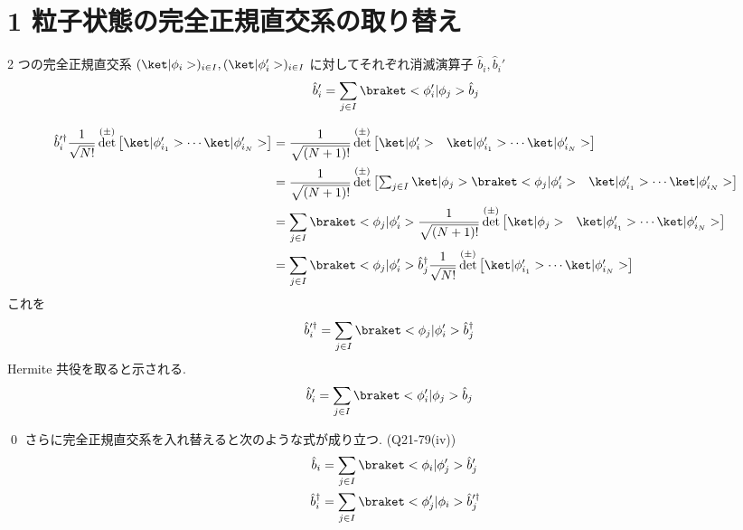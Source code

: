 \documentclass[uplatex,dvipdfmx,a4paper,11pt]{jlreq}
\makeatletter
\DeclareMathOperator{\Det}{det}
\numberwithin{equation}{section}
\theoremstyle{definition}
\renewenvironment{proof}[1][\proofname]{\par
  \normalfont
  \topsep6\p@\@plus6\p@ \trivlist
  \item[\hskip\labelsep{\bfseries #1}\@addpunct{\bfseries}]\ignorespaces\quad\par
}{
  \qed\endtrivlist\@endpefalse
}
\renewcommand\proofname{証明}
\makeatother
\begin{document}
\section{1 粒子状態の完全正規直交系の取り替え}
\begin{theorem}
  2 つの完全正規直交系 $(\ket|\phi_i>)_{i\in I}, (\ket|\phi_i'>)_{i\in I}$ に対してそれぞれ消滅演算子 $\hat{b}_i, \hat{b}_i'$
  \begin{align}
    \hat{b}_i' = \sum_{j\in I}\braket<\phi_i'|\phi_j>\hat{b}_j
  \end{align}
\end{theorem}
\begin{proof}
  \begin{align}
    \hat{b}_i^{\prime\dagger}\frac{1}{\sqrt{N!}}\Det^{(\pm)}\begin{bmatrix}\ket|\phi_{i_1}'>\cdots\ket|\phi_{i_N}'>\end{bmatrix}
     & = \frac{1}{\sqrt{(N+1)!}}\Det^{(\pm)}\begin{bmatrix}\ket|\phi_i'> & \ket|\phi_{i_1}'>\cdots\ket|\phi_{i_N}'>\end{bmatrix}                                    \\
     & = \frac{1}{\sqrt{(N+1)!}}\Det^{(\pm)}\begin{bmatrix}\sum_{j\in I}\ket|\phi_j>\braket<\phi_j|\phi_i'> & \ket|\phi_{i_1}'>\cdots\ket|\phi_{i_N}'>\end{bmatrix} \\
     & = \sum_{j\in I}\braket<\phi_j|\phi_i'>\frac{1}{\sqrt{(N+1)!}}\Det^{(\pm)}\begin{bmatrix}\ket|\phi_j> & \ket|\phi_{i_1}'>\cdots\ket|\phi_{i_N}'>\end{bmatrix} \\
     & = \sum_{j\in I}\braket<\phi_j|\phi_i'>\hat{b}_j^\dagger\frac{1}{\sqrt{N!}}\Det^{(\pm)}\begin{bmatrix}\ket|\phi_{i_1}'>\cdots\ket|\phi_{i_N}'>\end{bmatrix}
  \end{align}
  これを
  \begin{align}
    \hat{b}_i^{\prime\dagger} & = \sum_{j\in I}\braket<\phi_j|\phi_i'>\hat{b}_j^\dagger
  \end{align}
  Hermite 共役を取ると示される.
  \begin{align}
    \hat{b}_i^{\prime} & = \sum_{j\in I}\braket<\phi_i'|\phi_j>\hat{b}_j
  \end{align}
\end{proof}
さらに完全正規直交系を入れ替えると次のような式が成り立つ. (Q21-79(iv))
\begin{align}
  \hat{b}_i         & = \sum_{j\in I}\braket<\phi_i|\phi_j'>\hat{b}_j'                \\
  \hat{b}_i^\dagger & = \sum_{j\in I}\braket<\phi_j'|\phi_i>\hat{b}_j^{\prime\dagger}
\end{align}
\end{document}
